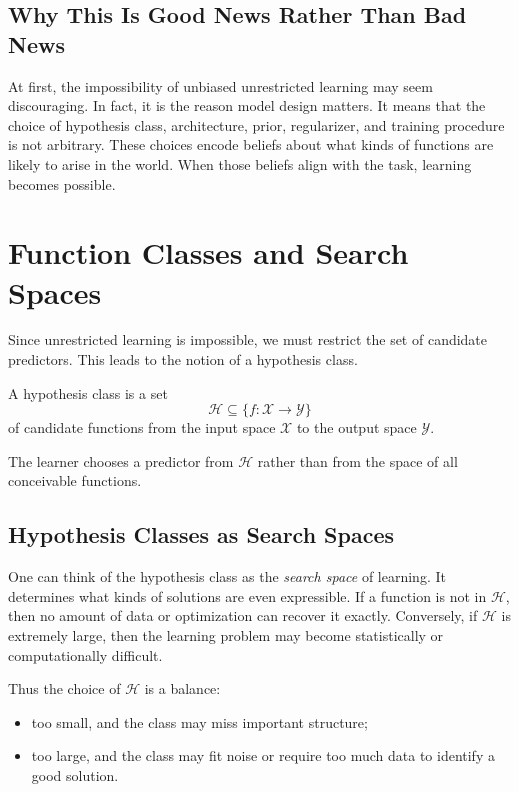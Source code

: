 \subsection{Why This Is Good News Rather Than Bad News}

At first, the impossibility of unbiased unrestricted learning may seem discouraging. In fact, it is the reason model design matters. It means that the choice of hypothesis class, architecture, prior, regularizer, and training procedure is not arbitrary. These choices encode beliefs about what kinds of functions are likely to arise in the world. When those beliefs align with the task, learning becomes possible.

\section{Function Classes and Search Spaces}

Since unrestricted learning is impossible, we must restrict the set of candidate predictors. This leads to the notion of a hypothesis class.

\begin{definition}
A hypothesis class is a set
\[
\mathcal{H} \subseteq \{f : \mathcal{X}\to\mathcal{Y}\}
\]
of candidate functions from the input space $\mathcal{X}$ to the output space $\mathcal{Y}$.
\end{definition}

The learner chooses a predictor from $\mathcal{H}$ rather than from the space of all conceivable functions.

\subsection{Hypothesis Classes as Search Spaces}

One can think of the hypothesis class as the \emph{search space} of learning. It determines what kinds of solutions are even expressible. If a function is not in $\mathcal{H}$, then no amount of data or optimization can recover it exactly. Conversely, if $\mathcal{H}$ is extremely large, then the learning problem may become statistically or computationally difficult.

Thus the choice of $\mathcal{H}$ is a balance:
\begin{itemize}
    \item too small, and the class may miss important structure;
    \item too large, and the class may fit noise or require too much data to identify a good solution.
\end{itemize}

